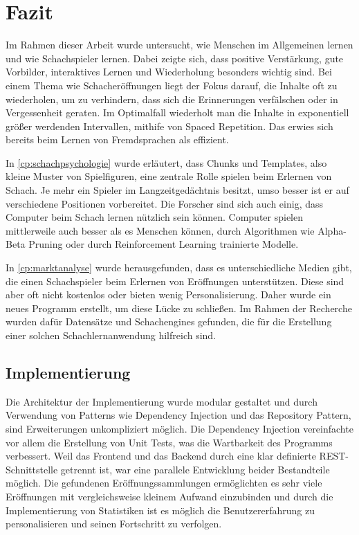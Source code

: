 
\chapter{Fazit}
Im Rahmen dieser Arbeit wurde untersucht, wie Menschen im Allgemeinen lernen und wie Schachspieler lernen. Dabei zeigte sich, dass positive Verstärkung, gute Vorbilder, interaktives Lernen und Wiederholung besonders wichtig sind.
Bei einem Thema wie Schacheröffnungen liegt der Fokus darauf, die Inhalte oft zu wiederholen, um zu verhindern, dass sich die Erinnerungen verfälschen oder in Vergessenheit geraten. Im Optimalfall wiederholt man die Inhalte in exponentiell größer werdenden Intervallen, mithife von Spaced Repetition. Das erwies sich bereits beim Lernen von Fremdsprachen als effizient.

In \autoref{cp:schachpsychologie} wurde erläutert, dass Chunks und Templates, also kleine Muster von Spielfiguren, eine zentrale Rolle spielen beim Erlernen von Schach. Je mehr ein Spieler im Langzeitgedächtnis besitzt, umso besser ist er auf verschiedene Positionen vorbereitet. Die Forscher sind sich auch einig, dass Computer beim Schach lernen nützlich sein können. Computer spielen mittlerweile auch besser als es Menschen können, durch Algorithmen wie Alpha-Beta Pruning oder durch Reinforcement Learning trainierte Modelle.

In \autoref{cp:marktanalyse} wurde herausgefunden, dass es unterschiedliche Medien gibt, die einen Schachspieler beim Erlernen von Eröffnungen unterstützen. Diese sind aber oft nicht kostenlos oder bieten wenig Personalisierung. Daher wurde ein neues Programm erstellt, um diese Lücke zu schließen. Im Rahmen der Recherche wurden dafür Datensätze und Schachengines gefunden, die für die Erstellung einer solchen Schachlernanwendung hilfreich sind.

\section{Implementierung}
Die Architektur der Implementierung wurde modular gestaltet und durch Verwendung von Patterns wie Dependency Injection und das Repository Pattern, sind Erweiterungen unkompliziert möglich. Die Dependency Injection vereinfachte vor allem die Erstellung von Unit Tests, was die Wartbarkeit des Programms verbessert. Weil das Frontend und das Backend durch eine klar definierte REST-Schnittstelle getrennt ist, war eine parallele Entwicklung beider Bestandteile möglich. Die gefundenen Eröffnungssammlungen ermöglichten es sehr viele Eröffnungen mit vergleichsweise kleinem Aufwand einzubinden und durch die Implementierung von Statistiken ist es möglich die Benutzererfahrung zu personalisieren und seinen Fortschritt zu verfolgen.

